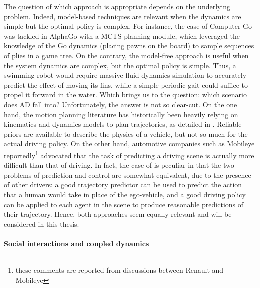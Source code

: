 The question of which approach is appropriate depends on the underlying problem. Indeed, model-based techniques are relevant when the dynamics are simple but the optimal policy is complex. For instance, the case of Computer Go was tackled in AlphaGo \citep{Silver2016,Silver2017,Silver2018} with a \gls{MCTS} planning module, which leveraged the knowledge of the Go dynamics (placing pawns on the board) to sample sequences of plies in a game tree. On the contrary, the model-free approach is useful when the system dynamics are complex, but the optimal policy is simple. Thus, a swimming robot would require massive fluid dynamics simulation to accurately predict the effect of moving its fins, while a simple periodic gait could suffice to propel it forward in the water. Which brings us to the question: which scenario does \gls{AD} fall into? Unfortunately, the answer is not so clear-cut. On the one hand, the motion planning literature has historically been heavily relying on kinematics and dynamics models to plan trajectories, as detailed in . Reliable priors are available to describe the physics of a vehicle, but not so much for the actual driving policy. On the other hand, automotive companies such as Mobileye reportedly\footnote{these comments are reported from discussions between Renault and Mobileye} advocated that the task of predicting a driving scene is actually more difficult than that of driving. In fact, the case of  is peculiar in that the two problems of prediction and control are somewhat equivalent, due to the presence of other drivers: a good trajectory predictor can be used to predict the action that a human would take in place of the ego-vehicle, and a good driving policy can be applied to each agent in the scene to produce reasonable predictions of their trajectory. Hence, both approaches seem equally relevant and will be considered in this thesis.

\paragraph{Social interactions and coupled dynamics}


